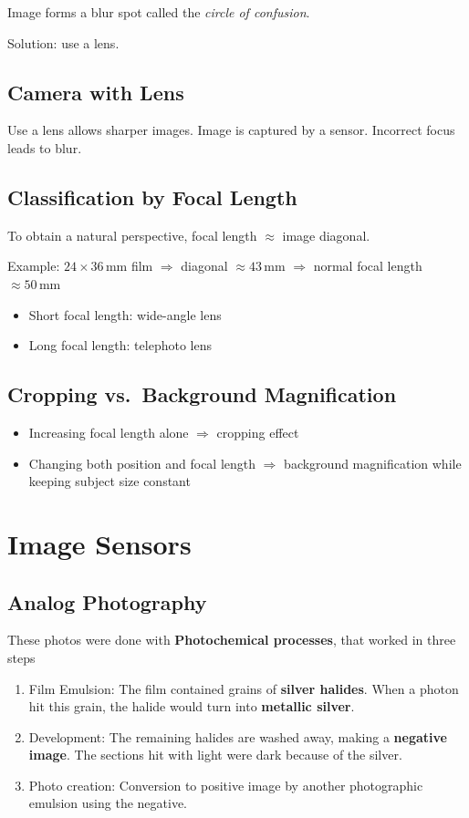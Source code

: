 \documentclass{article}
\begin{document}
Image forms a blur spot called the \textit{circle of confusion}.

Solution: use a lens.

\subsection{Camera with Lens}
Use a lens allows sharper images. Image is captured by a sensor. Incorrect focus leads to blur.

\subsection{Classification by Focal Length}
To obtain a natural perspective, focal length $\approx$ image diagonal.

Example: $24 \times 36\,\text{mm}$ film $\Rightarrow$ diagonal $\approx 43\,\text{mm}$  
$\Rightarrow$ normal focal length $\approx 50\,\text{mm}$

\begin{itemize}
  \item Short focal length: wide-angle lens
  \item Long focal length: telephoto lens
\end{itemize}

\subsection{Cropping vs.\ Background Magnification}
\begin{itemize}
  \item Increasing focal length alone $\Rightarrow$ cropping effect
  \item Changing both position and focal length $\Rightarrow$ background magnification while keeping subject size constant
\end{itemize}
\section{Image Sensors}

\subsection{Analog Photography}
These photos were done with \textbf{Photochemical processes}, that worked in three steps
\begin{enumerate}
  \item Film Emulsion: The film contained grains of \textbf{silver halides}. When a photon hit this grain, the halide would turn into \textbf{metallic silver}.
  
  \item Development: The remaining halides are washed away, making a \textbf{negative image}. The sections hit with light were dark because of the silver.
  
  \item Photo creation: Conversion to positive image by another photographic emulsion using the negative. 
\end{enumerate}
\end{document}
